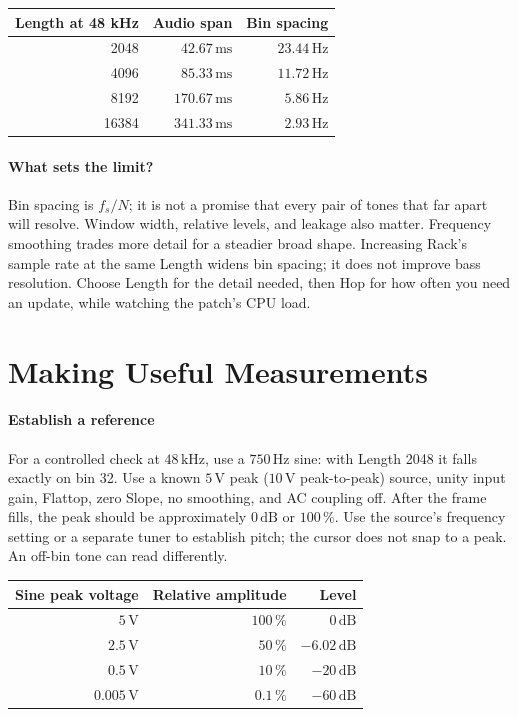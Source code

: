 \begin{center}
\renewcommand{\arraystretch}{1.25}
\begin{tabular}{@{}rrr@{}}
\toprule
\textbf{Length at 48 kHz} & \textbf{Audio span} & \textbf{Bin spacing} \\
\midrule
2048 & $42.67\,\mathrm{ms}$ & $23.44\,\mathrm{Hz}$ \\
4096 & $85.33\,\mathrm{ms}$ & $11.72\,\mathrm{Hz}$ \\
8192 & $170.67\,\mathrm{ms}$ & $5.86\,\mathrm{Hz}$ \\
16384 & $341.33\,\mathrm{ms}$ & $2.93\,\mathrm{Hz}$ \\
\bottomrule
\end{tabular}
\end{center}

\paragraph{What sets the limit?}
Bin spacing is $f_s/N$; it is not a promise that every pair of tones that far
apart will resolve. Window width, relative levels, and leakage also matter.
Frequency smoothing trades more detail for a steadier broad shape. Increasing
Rack's sample rate at the same Length widens bin spacing; it does not improve
bass resolution. Choose Length for the detail needed, then Hop for how often
you need an update, while watching the patch's CPU load.

\clearpage
\section{Making Useful Measurements}\label{sec:measurements}

\paragraph{Establish a reference}
For a controlled check at $48\,\mathrm{kHz}$, use a $750\,\mathrm{Hz}$ sine:
with Length 2048 it falls exactly on bin 32. Use a known $5\,\mathrm{V}$
peak ($10\,\mathrm{V}$ peak-to-peak) source, unity input gain, Flattop,
zero Slope, no smoothing, and AC coupling off. After the frame fills,
the peak should be approximately $0\,\mathrm{dB}$ or $100\,\%$.
Use the source's frequency setting or a separate tuner to establish pitch;
the cursor does not snap to a peak. An off-bin tone can read differently.

\begin{center}
\renewcommand{\arraystretch}{1.25}
\begin{tabular}{@{}rrr@{}}
\toprule
\textbf{Sine peak voltage} & \textbf{Relative amplitude} & \textbf{Level} \\
\midrule
$5\,\mathrm{V}$ & $100\,\%$ & $0\,\mathrm{dB}$ \\
$2.5\,\mathrm{V}$ & $50\,\%$ & $-6.02\,\mathrm{dB}$ \\
$0.5\,\mathrm{V}$ & $10\,\%$ & $-20\,\mathrm{dB}$ \\
$0.005\,\mathrm{V}$ & $0.1\,\%$ & $-60\,\mathrm{dB}$ \\
\bottomrule
\end{tabular}
\end{center}

